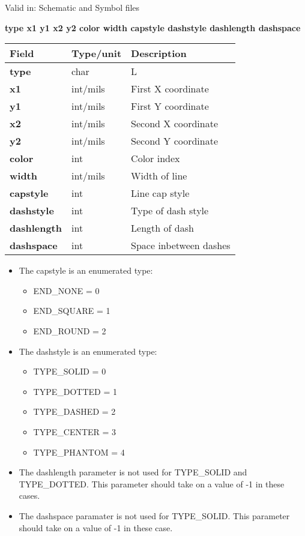 \documentclass{article}
\begin{document}
Valid in: Schematic and Symbol files

{\bf type x1 y1 x2 y2 color width capstyle dashstyle dashlength dashspace}

\begin{table}[h]
\begin{tabular}{|l|l|l|} \hline
Field 		& Type/unit 	& Description \\ \hline 
\hline
{\bf type} 	& char 		& L \\ \hline
{\bf x1} 	& int/mils 	& First X coordinate \\ \hline
{\bf y1} 	& int/mils 	& First Y coordinate \\ \hline
{\bf x2} 	& int/mils 	& Second X coordinate \\ \hline
{\bf y2} 	& int/mils 	& Second Y coordinate \\ \hline
{\bf color} 	& int 		& Color index \\ \hline
{\bf width} 	& int/mils 	& Width of line \\ \hline
{\bf capstyle} 	& int 		& Line cap style \\ \hline
{\bf dashstyle} & int 		& Type of dash style \\ \hline
{\bf dashlength}& int 		& Length of dash \\ \hline
{\bf dashspace} & int 		& Space inbetween dashes \\ \hline
\end{tabular}
\end{table}

\begin{itemize}
\item The capstyle is an enumerated type: 
\begin{itemize}
	\item END\_NONE = 0
	\item END\_SQUARE = 1
	\item END\_ROUND = 2
\end{itemize}
\item The dashstyle is an enumerated type: 
\begin{itemize}
	\item TYPE\_SOLID = 0 
	\item TYPE\_DOTTED = 1
	\item TYPE\_DASHED = 2
	\item TYPE\_CENTER = 3
        \item TYPE\_PHANTOM = 4
\end{itemize}
\item The dashlength parameter is not used for TYPE\_SOLID and TYPE\_DOTTED.  
      This parameter should take on a value of -1 in these cases.
\item The dashspace paramater is not used for TYPE\_SOLID.
      This parameter should take on a value of -1 in these case.
\end{itemize}
\end{document}
